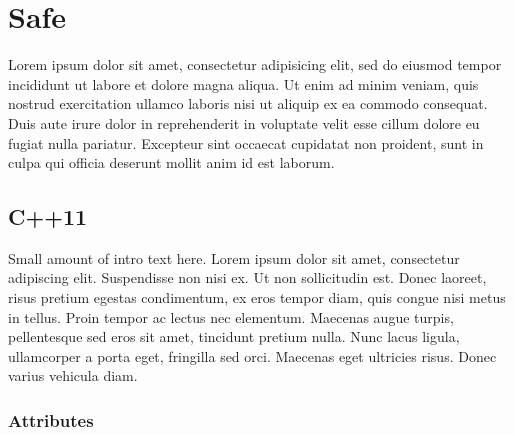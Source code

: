 \documentclass[twoside,10pt,letterpaper,usenames]{newstyle-PearsonGeneric-7-38}
\author{}
\date{}
\begin{document}




% 
% 
% 

%

\cleardoublepage %

\chapter{Safe}\label{SafeChap}
 
    
Lorem ipsum dolor sit amet, consectetur adipisicing elit, sed do eiusmod tempor incididunt ut labore et dolore magna aliqua. Ut enim ad minim veniam, quis nostrud exercitation ullamco laboris nisi ut aliquip ex ea commodo consequat. Duis aute irure dolor in reprehenderit in voluptate velit esse cillum dolore eu fugiat nulla pariatur. Excepteur sint occaecat cupidatat non proident, sunt in culpa qui officia deserunt mollit anim id est laborum.


\section[C++11]{C++11}\label{c++11}

Small amount of intro text here. Lorem ipsum dolor sit amet, consectetur
adipiscing elit. Suspendisse non nisi ex. Ut non sollicitudin est. Donec
laoreet, risus pretium egestas condimentum, ex eros tempor diam, quis
congue nisi metus in tellus. Proin tempor ac lectus nec elementum.
Maecenas augue turpis, pellentesque sed eros sit amet, tincidunt pretium
nulla. Nunc lacus ligula, ullamcorper a porta eget, fringilla sed orci.
Maecenas eget ultricies risus. Donec varius vehicula diam.

\subsection[Attributes]{Attributes}\label{attributes}
\end{document}

